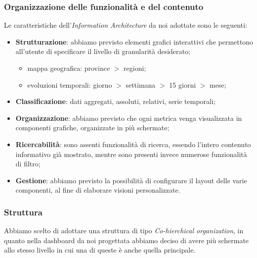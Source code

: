 \subsubsection{Organizzazione delle funzionalità e del contenuto}
Le caratteristiche dell'\textit{Information Architecture} da noi adottate sono le seguenti:
\begin{itemize}
	\item \textbf{Strutturazione}: abbiamo previsto elementi grafici interattivi che permettono all'utente di specificare il livello di granularità desiderato;
	\begin{itemize}
		\item mappa geografica: province $>$ regioni;
		\item evoluzioni temporali: giorno $>$ settimana $>$ 15 giorni $>$ mese;
	\end{itemize}
	\item \textbf{Classificazione}: dati aggregati, assoluti, relativi, serie temporali;
	\item \textbf{Organizzazione}: abbiamo previsto che ogni metrica venga visualizzata in componenti grafiche, organizzate in più schermate;
	\item \textbf{Ricercabilità}: sono assenti funzionalità di ricerca, essendo l'intero contenuto informativo già mostrato, mentre sono presenti invece numerose funzionalità di filtro;
	\item \textbf{Gestione}: abbiamo previsto la possibilità di configurare il layout delle varie componenti, al fine di elaborare visioni personalizzate.
\end{itemize}

\subsubsection{Struttura}
Abbiamo scelto di adottare una struttura di tipo \textit{Co-hierchical organization}, in quanto nella dashboard da noi progettata abbiamo deciso di avere più schermate allo stesso livello in cui una di queste è anche quella principale.